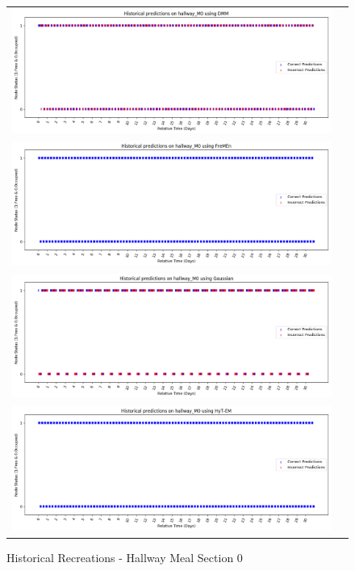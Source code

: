 \begin{center}
\begin{figure}[!Hp]
  \begin{tabular}{cc}
    {\includegraphics[width = 6in]{images/results/Historical_hallway_M0_DMM.png}} \\
    {\includegraphics[width = 6in]{images/results/Historical_hallway_M0_FreMEn.png}} \\
    {\includegraphics[width = 6in]{images/results/Historical_hallway_M0_Gaussian.png}} \\
    {\includegraphics[width = 6in]{images/results/Historical_hallway_M0_HyT-EM.png}} \\
  \end{tabular}
  \caption{Historical Recreations - Hallway Meal Section 0}
\end{figure}


\end{center}
